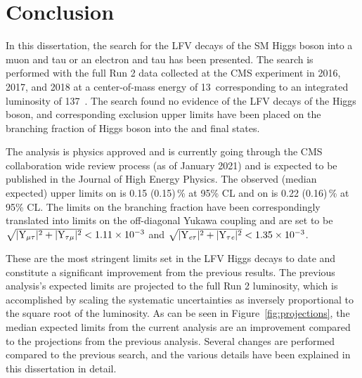 %
%

\chapter{Conclusion}
\label{conclusion}

In this dissertation, the search for the LFV decays of the SM Higgs boson into a muon and tau or an electron and tau has been presented. The search is performed with the full Run 2 data collected at the CMS experiment in 2016, 2017, and 2018 at a center-of-mass energy of 13~\TeV corresponding to an integrated luminosity of 137~\fb. The search found no evidence of the LFV decays of the Higgs boson, and corresponding exclusion upper limits have been placed on the branching fraction of Higgs boson into the \mutau and \etau final states.

The analysis is physics approved and is currently going through the CMS collaboration wide review process (as of January 2021) and is expected to be published in the Journal of High Energy Physics. The observed (median expected) upper limits on \BHmt is 0.15 (0.15)\,\% at 95\% CL and on \BHet is 0.22 (0.16)\,\% at 95\% CL. The limits on the branching fraction have been correspondingly translated into limits on the off-diagonal Yukawa coupling and are set to be $\sqrt{|\text{Y}_{\mu\tau}|^{2}+|\text{Y}_{\tau\mu}|^{2}} < 1.11 \times 10^{-3}$ and $\sqrt{|\text{Y}_{\textit{e}\tau}|^{2}+|\text{Y}_{\tau\textit{e}}|^{2}} < 1.35 \times 10^{-3}$.

These are the most stringent limits set in the LFV Higgs decays to date and constitute a significant improvement from the previous results. The previous analysis's expected limits are projected to the full Run 2 luminosity, which is accomplished by scaling the systematic uncertainties as inversely proportional to the square root of the luminosity. As can be seen in Figure~\ref{fig:projections}, the median expected limits from the current analysis are an improvement compared to the projections from the previous analysis. Several changes are performed compared to the previous search, and the various details have been explained in this dissertation in detail.


